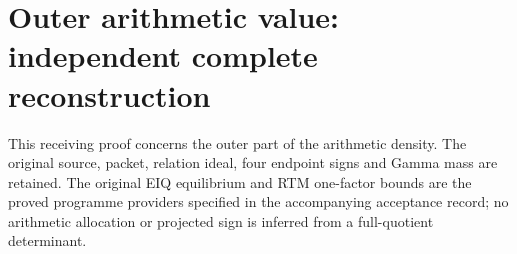 
\endgroup

\clearpage
\begingroup
\def\PP{\mathcal P}
\def\MM{\mathfrak M}
\def\BB{\mathcal B}

\setcounter{equation}{0}
\renewcommand{\theequation}{OR.\arabic{equation}}
\section*{Outer arithmetic value: independent complete reconstruction}



This receiving proof concerns the outer part of the arithmetic density.
The original source, packet, relation ideal, four endpoint signs and
Gamma mass are retained.  The original EIQ equilibrium and RTM
one-factor bounds are the proved programme providers specified in the
accompanying acceptance record; no arithmetic allocation or projected
sign is inferred from a full-quotient determinant.


